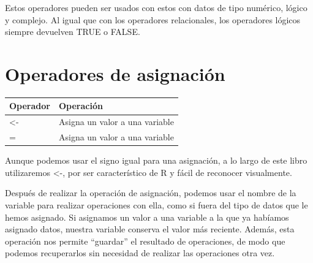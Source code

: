 \documentclass[
]{book}
\begin{document}
Estos operadores pueden ser usados con estos con datos de tipo numérico, lógico y complejo. Al igual que con los operadores relacionales, los operadores lógicos siempre devuelven TRUE o FALSE.

\hypertarget{operadores-de-asignaciuxf3n}{%
\section{Operadores de asignación}\label{operadores-de-asignaciuxf3n}}

\begin{longtable}[]{@{}ll@{}}
\toprule
Operador & Operación \\
\midrule
\endhead
\textless- & Asigna un valor a una variable \\
= & Asigna un valor a una variable \\
\bottomrule
\end{longtable}

Aunque podemos usar el signo igual para una asignación, a lo largo de este libro utilizaremos \textless-, por ser característico de R y fácil de reconocer visualmente.

Después de realizar la operación de asignación, podemos usar el nombre de la variable para realizar operaciones con ella, como si fuera del tipo de datos que le hemos asignado. Si asignamos un valor a una variable a la que ya habíamos asignado datos, nuestra variable conserva el valor más reciente. Además, esta operación nos permite ``guardar'' el resultado de operaciones, de modo que podemos recuperarlos sin necesidad de realizar las operaciones otra vez.

  
\end{document}
